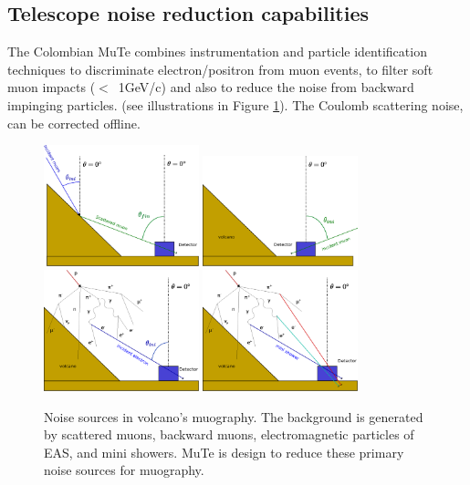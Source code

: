 \documentclass[letterpaper,10pt,titlepage,linenumber]{article}
\begin{document}
\subsection{Telescope noise reduction capabilities}
\label{subsec:NoiseReduction}
The Colombian MuTe combines instrumentation and particle identification techniques to discriminate electron/positron from muon events, to filter soft muon impacts ($<$~1GeV/c) and also to reduce the noise from backward impinging particles. (see illustrations in Figure \ref{fig:MuographyNoise}). The Coulomb scattering noise, can be corrected offline.

\begin{figure}
    \centering
    {\includegraphics[width=0.4\textwidth]{Figures/Muon_scattering.eps}}
    {\includegraphics[width=0.4\textwidth]{Figures/Albedo.eps}}
    {\includegraphics[width=0.4\textwidth]{Figures/EAS.eps}}
    {\includegraphics[width=0.4\textwidth]{Figures/Multi.eps}}
    \caption{Noise sources in volcano's muography. The background is generated by scattered muons, backward muons, electromagnetic particles of EAS, and mini showers. MuTe is design to reduce these primary noise sources for muography.}
    \label{fig:MuographyNoise}
\end{figure}
\end{document}
